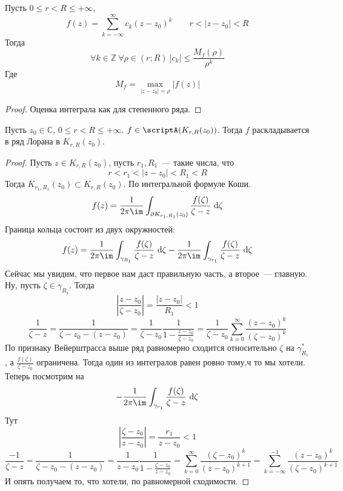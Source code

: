 \documentclass{article}
\begin{document}
    \begin{property}
        \label{Неравенства Коши для коэффициентов ряда Лорана}
        Пусть $0\leqslant r<R\leqslant+\infty$,
        $$
        f(z)=\sum\limits_{k=-\infty}^\infty c_k(z-z_0)^k\qquad r<|z-z_0|<R
        $$
        Тогда
        $$
        \forall k\in\mathbb Z~\forall\rho\in(r;R)~|c_k|\leqslant\frac{M_f(\rho)}{\rho^k}
        $$
        Где
        $$
        M_f=\max\limits_{|z-z_0|=\rho}|f(z)|
        $$
    \end{property}
    \begin{proof}
        Оценка интеграла как для степенного ряда.
    \end{proof}
    \begin{theorem}
        \label{Теорема Лорана}
        Пусть $z_0\in\mathbb C$, $0\leqslant r<R\leqslant+\infty$. $f\in\scriptA(K_{r,R}(z_0))$. Тогда $f$ раскладывается в ряд Лорана в $K_{r,R}(z_0)$.
    \end{theorem}
    \begin{proof}
        Пусть $z\in K_{r,R}(z_0)$, пусть $r_1,R_1$~--- такие числа, что
        $$
        r<r_1<|z-z_0|<R_1<R
        $$
        Тогда $\overline K_{r_1,R_1}(z_0)\subset K_{r,R}(z_0)$. По интегральной формуле Коши.
        $$
        f(z)=\frac1{2\pi\im}\int_{\partial K_{r_1,R_1}(z_0)}\frac{f(\zeta)}{\zeta-z}~\mathrm d\zeta
        $$
        Граница кольца состоит из двух окружностей:
        $$
        f(z)=\frac1{2\pi\im}\int_{\gamma_{R_1}}\frac{f(\zeta)}{\zeta-z}~\mathrm d\zeta-\frac1{2\pi\im}\int_{\gamma_{r_1}}\frac{f(\zeta)}{\zeta-z}~\mathrm d\zeta
        $$
        Сейчас мы увидим, что первое нам даст правильную часть, а второе~--- главную. Ну, пусть $\zeta\in\gamma_{R_1}$. Тогда
        $$\left|\frac{z-z_0}{\zeta-z_0}\right|=\frac{|z-z_0|}{R_1}<1$$
        $$
        \frac1{\zeta-z}=\frac1{\zeta-z_0-(z-z_0)}=\frac1{\zeta-z_0}\frac1{1-\frac{z-z_0}{\zeta-z_0}}=\frac1{\zeta-z_0}\sum\limits_{k=0}^\infty\frac{(z-z_0)^k}{(\zeta-z_0)^k}
        $$
        По признаку Вейерштрасса выше ряд равномерно сходится относительно $\zeta$ на $\gamma^*_{R_1}$, а $\frac{f(\zeta)}{\zeta-z_0}$ ограничена. Тогда один из интегралов равен ровно тому,ч то мы хотели.\\
        Теперь посмотрим на
        $$
        -\frac1{2\pi\im}\int_{\gamma_{r_1}}\frac{f(\zeta)}{\zeta-z}~\mathrm d\zeta
        $$
        Тут
        $$
        \left|\frac{\zeta-z_0}{z-z_0}\right|=\frac{r_1}{z-z_0}<1
        $$
        $$
        \frac{-1}{\zeta-z}=\frac1{\zeta-z_0-(z-z_0)}=\frac1{z-z_0}\frac1{1-\frac{\zeta-z_0}{z-z_0}}=\sum\limits_{k=0}^\infty\frac{(\zeta-z_0)^k}{(z-z_0)^{k+1}}=\sum\limits_{k=-\infty}^{-1}\frac{(z-z_0)^k}{(\zeta-z_0)^{k+1}}
        $$
        И опять получаем то, что хотели, по равномерной сходимости.
    \end{proof}
\end{document}

